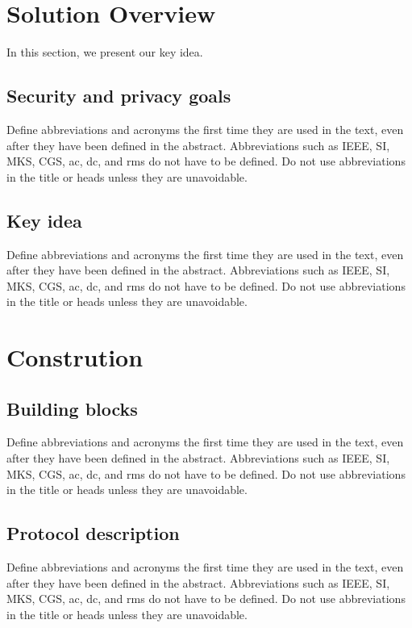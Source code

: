 \documentclass[conference]{IEEEtran}
\begin{document}
 
 
 


\section{Solution Overview}
In this section, we present our key idea.

\subsection{Security and privacy goals}

Define abbreviations and acronyms the first time they are used in the text, 
even after they have been defined in the abstract. Abbreviations such as 
IEEE, SI, MKS, CGS, ac, dc, and rms do not have to be defined. Do not use 
abbreviations in the title or heads unless they are unavoidable.

\subsection{Key idea}

Define abbreviations and acronyms the first time they are used in the text, 
even after they have been defined in the abstract. Abbreviations such as 
IEEE, SI, MKS, CGS, ac, dc, and rms do not have to be defined. Do not use 
abbreviations in the title or heads unless they are unavoidable.

\section{Constrution}

\subsection{Building blocks}

Define abbreviations and acronyms the first time they are used in the text, 
even after they have been defined in the abstract. Abbreviations such as 
IEEE, SI, MKS, CGS, ac, dc, and rms do not have to be defined. Do not use 
abbreviations in the title or heads unless they are unavoidable.

\subsection{Protocol description}

Define abbreviations and acronyms the first time they are used in the text, 
even after they have been defined in the abstract. Abbreviations such as 
IEEE, SI, MKS, CGS, ac, dc, and rms do not have to be defined. Do not use 
abbreviations in the title or heads unless they are unavoidable.
\end{document}
